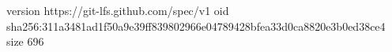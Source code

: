 version https://git-lfs.github.com/spec/v1
oid sha256:311a3481ad1f50a9e39ff839802966e04789428bfea33d0ca8820e3b0ed38ce4
size 696
